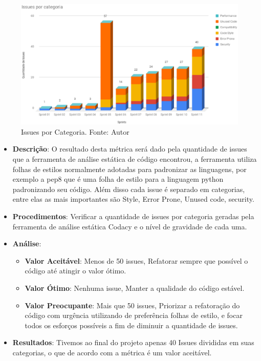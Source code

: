 
\begin{figure}[h!]
	\centering
  \includegraphics[keepaspectratio=true,scale=0.4]{figuras/issues_por_categoria.eps}
  \caption[Issues por Categoria.]{Issues por Categoria. Fonte: Autor}
	\label{fig:issues_categoria}
\end{figure}

\begin{itemize}
  \item \textbf{Descrição}: O resultado desta métrica será dado pela quantidade de issues que a ferramenta de análise estática de código encontrou, a ferramenta utiliza folhas de estilos normalmente adotadas para padronizar as linguagens, por exemplo a pep8 que é uma folha de estilo para a linguagem python padronizando seu código. Além disso cada issue é separado em categorias, entre elas as mais importantes são Style, Error Prone, Unused code, security.
  \item \textbf{Procedimentos}: Verificar a quantidade de issues por categoria geradas pela ferramenta de análise estática Codacy e o nível de gravidade de cada uma.
  \item \textbf{Análise}:
    \begin{itemize}
      \item \textbf{Valor Aceitável}: Menos de 50 issues, Refatorar sempre que possível o código até atingir o valor ótimo.
      \item \textbf{Valor Ótimo}: Nenhuma issue, Manter a qualidade do código estável.
      \item \textbf{Valor Preocupante}: Mais que 50 issues, Priorizar a refatoração do código com urgência utilizando de preferência folhas de estilo, e focar todos os esforços possíveis a fim de diminuir a quantidade de issues.
    \end{itemize}
  \item \textbf{Resultados}: Tivemos ao final do projeto apenas 40 Issues divididas em suas categorias, o que de acordo com a métrica é um valor aceitável.
\end{itemize}

